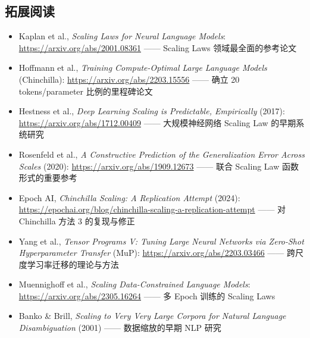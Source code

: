 \documentclass[a4paper]{article}
\begin{document}
\subsection{拓展阅读}

\begin{itemize}
    \item Kaplan et al., \textit{Scaling Laws for Neural Language Models}: \url{https://arxiv.org/abs/2001.08361} —— Scaling Laws 领域最全面的参考论文
    \item Hoffmann et al., \textit{Training Compute-Optimal Large Language Models} (Chinchilla): \url{https://arxiv.org/abs/2203.15556} —— 确立 20 tokens/parameter 比例的里程碑论文
    \item Hestness et al., \textit{Deep Learning Scaling is Predictable, Empirically} (2017): \url{https://arxiv.org/abs/1712.00409} —— 大规模神经网络 Scaling Law 的早期系统研究
    \item Rosenfeld et al., \textit{A Constructive Prediction of the Generalization Error Across Scales} (2020): \url{https://arxiv.org/abs/1909.12673} —— 联合 Scaling Law 函数形式的重要参考
    \item Epoch AI, \textit{Chinchilla Scaling: A Replication Attempt} (2024): \url{https://epochai.org/blog/chinchilla-scaling-a-replication-attempt} —— 对 Chinchilla 方法 3 的复现与修正
    \item Yang et al., \textit{Tensor Programs V: Tuning Large Neural Networks via Zero-Shot Hyperparameter Transfer} (MuP): \url{https://arxiv.org/abs/2203.03466} —— 跨尺度学习率迁移的理论与方法
    \item Muennighoff et al., \textit{Scaling Data-Constrained Language Models}: \url{https://arxiv.org/abs/2305.16264} —— 多 Epoch 训练的 Scaling Laws
    \item Banko \& Brill, \textit{Scaling to Very Very Large Corpora for Natural Language Disambiguation} (2001) —— 数据缩放的早期 NLP 研究
\end{itemize}
\end{document}
